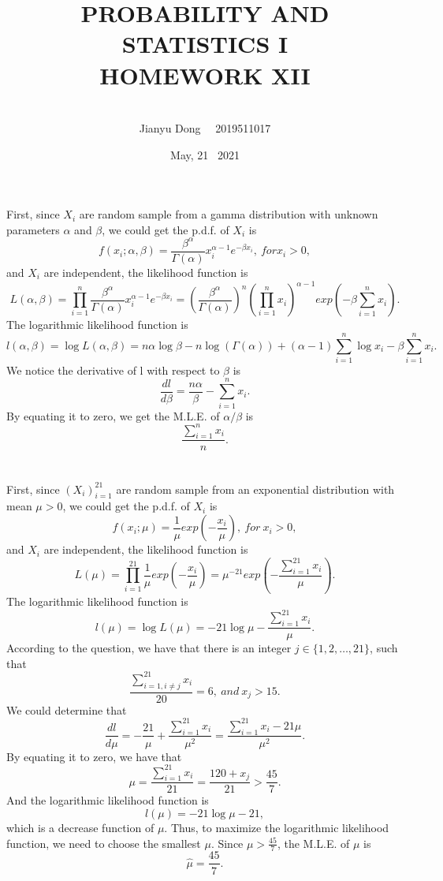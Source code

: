 \documentclass[10.5pt]{article}
\title{PROBABILITY AND STATISTICS I
\\HOMEWORK XII}
\author{\\Jianyu Dong   ~~2019511017}
\date{May, 21~ 2021}
\begin{document}
    
\maketitle
\newpage

\section{}
First, since $X_i$ are random sample from a gamma distribution with unknown parameters $\alpha$ and $\beta$, we could get the p.d.f. of $X_i$ is $$f(x_i;\alpha,\beta)=\frac{\beta^{\alpha}}{\Gamma(\alpha)}x_i^{\alpha-1}e^{-\beta x_i},~for x_i>0,$$\indent
and $X_i$ are independent, the likelihood function is $$L(\alpha,\beta)=\prod_{i=1}^n\frac{\beta^{\alpha}}{\Gamma(\alpha)}x_i^{\alpha-1}e^{-\beta x_i}=\left(\frac{\beta^{\alpha}}{\Gamma(\alpha)}\right)^n\left(\prod_{i=1}^nx_i\right)^{\alpha-1}exp\left(-\beta\sum_{i=1}^nx_i\right).$$\indent
The logarithmic likelihood function is $$l(\alpha,\beta)=\log L(\alpha,\beta)=n\alpha\log\beta-n\log(\Gamma(\alpha))+(\alpha-1)\sum_{i=1}^n\log x_i-\beta\sum_{i=1}^nx_i.$$\indent
We notice the derivative of l with respect to $\beta$ is $$\frac{dl}{d\beta}=\frac{n\alpha}{\beta}-\sum_{i=1}^nx_i.$$\indent
By equating it to zero, we get the M.L.E. of $\alpha/\beta$ is $$\frac{\sum_{i=1}^nx_i}{n}.$$

\section{}
First, since $(X_i)_{i=1}^{21}$ are random sample from an exponential distribution with mean $\mu>0$, we could get the p.d.f. of $X_i$ is $$f(x_i;\mu)=\frac{1}{\mu}exp(-\frac{x_i}{\mu}),~for ~x_i>0,$$\indent
and $X_i$ are independent, the likelihood function is $$L(\mu)=\prod_{i=1}^{21}\frac{1}{\mu}exp(-\frac{x_i}{\mu})=\mu^{-21}exp(-\frac{\sum_{i=1}^{21}x_i}{\mu}).$$\indent
The logarithmic likelihood function is $$l(\mu)=\log L(\mu)=-21\log\mu-\frac{\sum_{i=1}^{21}x_i}{\mu}.$$\indent
According to the question, we have that there is an integer $j\in\{1,2,\dots,21\}$, such that $$\frac{\sum_{i=1,i\neq j}^{21}x_i}{20}=6,~and~x_j>15.$$\indent
We could determine that $$\frac{dl}{d\mu}=-\frac{21}{\mu}+\frac{\sum_{i=1}^{21}x_i}{\mu^2}=\frac{\sum_{i=1}^{21}x_i-21\mu}{\mu^2}.$$\indent
By equating it to zero, we have that $$\mu=\frac{\sum_{i=1}^{21}x_i}{21}=\frac{120+x_j}{21}>\frac{45}{7}.$$\indent
And the logarithmic likelihood function is $$l(\mu)=-21\log\mu-21,$$\indent
which is a decrease function of $\mu$. Thus, to maximize the logarithmic likelihood function, we need to choose the smallest $\mu$. Since $\mu>\frac{45}{7}$, the M.L.E. of $\mu$ is $$\hat{\mu}=\frac{45}{7}.$$
\end{document}
